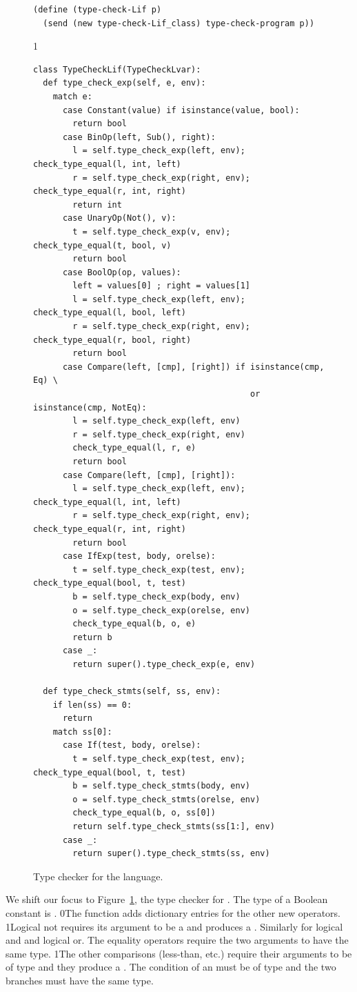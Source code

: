 \documentclass[7x10,nocrop]{TimesAPriori_MIT}%
\def\racketEd{0}
\def\pythonEd{1}
\def\edition{0}
\newcommand{\racket}[1]{{\if\edition\racketEd{#1}\fi}}
\newcommand{\python}[1]{{\if\edition\pythonEd #1\fi}}
\begin{document}
\begin{figure}[tbp]
{\begin{lstlisting}[basicstyle=\ttfamily\footnotesize]
(define (type-check-Lif p)
  (send (new type-check-Lif_class) type-check-program p))
\end{lstlisting}
\fi}
{\if\edition\pythonEd
\begin{lstlisting}
class TypeCheckLif(TypeCheckLvar):
  def type_check_exp(self, e, env):
    match e:
      case Constant(value) if isinstance(value, bool):
        return bool
      case BinOp(left, Sub(), right):
        l = self.type_check_exp(left, env); check_type_equal(l, int, left)
        r = self.type_check_exp(right, env); check_type_equal(r, int, right)
        return int
      case UnaryOp(Not(), v):
        t = self.type_check_exp(v, env); check_type_equal(t, bool, v)
        return bool 
      case BoolOp(op, values):
        left = values[0] ; right = values[1]
        l = self.type_check_exp(left, env); check_type_equal(l, bool, left)
        r = self.type_check_exp(right, env); check_type_equal(r, bool, right)
        return bool
      case Compare(left, [cmp], [right]) if isinstance(cmp, Eq) \
                                            or isinstance(cmp, NotEq):
        l = self.type_check_exp(left, env)
        r = self.type_check_exp(right, env)
        check_type_equal(l, r, e)
        return bool
      case Compare(left, [cmp], [right]):
        l = self.type_check_exp(left, env); check_type_equal(l, int, left)
        r = self.type_check_exp(right, env); check_type_equal(r, int, right)
        return bool
      case IfExp(test, body, orelse):
        t = self.type_check_exp(test, env); check_type_equal(bool, t, test)
        b = self.type_check_exp(body, env)
        o = self.type_check_exp(orelse, env)
        check_type_equal(b, o, e)
        return b
      case _:
        return super().type_check_exp(e, env)

  def type_check_stmts(self, ss, env):
    if len(ss) == 0:
      return
    match ss[0]:
      case If(test, body, orelse):
        t = self.type_check_exp(test, env); check_type_equal(bool, t, test)
        b = self.type_check_stmts(body, env)
        o = self.type_check_stmts(orelse, env)
        check_type_equal(b, o, ss[0])
        return self.type_check_stmts(ss[1:], env)
      case _:
        return super().type_check_stmts(ss, env)
\end{lstlisting}
\fi}
\caption{Type checker for the \LangIf{} language.}
\label{fig:type-check-Lif}
\end{figure}

We shift our focus to Figure~\ref{fig:type-check-Lif}, the type
checker for \LangIf{}.
%
The type of a Boolean constant is \BOOLTY{}.
%
\racket{The  function adds dictionary entries for
  the other new operators.}
%
\python{Logical not requires its argument to be a \BOOLTY{} and
  produces a \BOOLTY{}. Similarly for logical and and logical or. }
%
The equality operators require the two arguments to have the same
type.
%
\python{The other comparisons (less-than, etc.) require their
arguments to be of type \INTTY{} and they produce a \BOOLTY{}.}
%
The condition of an  must
be of \BOOLTY{} type and the two branches must have the same type.
\end{document}
